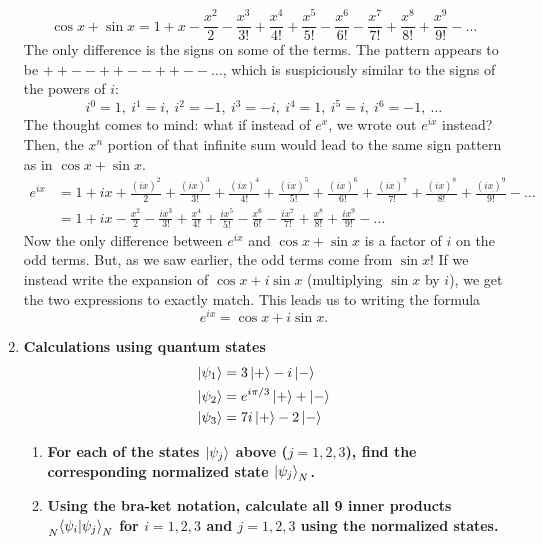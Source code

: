 \documentclass[11pt]{article}
\begin{document}
\begin{enumerate}[label=\textbf{\arabic*.}]
{\begin{enumerate}[label=\textbf{(\alph*)}]
                \[\cos x+\sin x=1+x-\frac{x^2}{2}-\frac{x^3}{3!}+\frac{x^4}{4!}+\frac{x^5}{5!}-\frac{x^6}{6!}-\frac{x^7}{7!}+\frac{x^8}{8!}+\frac{x^9}{9!}-\ldots\]
                The only difference is the signs on some of the terms. The pattern appears to be \(++--++--++--\ldots\), which is suspiciously similar to the signs of the powers of \(i\):
                \[i^0=1,\ i^1=i,\ i^2=-1,\ i^3=-i,\ i^4=1,\ i^5=i,\ i^6=-1,\ \ldots\]
                The thought comes to mind: what if instead of \(e^x\), we wrote out \(e^{ix}\) instead? Then, the \(x^n\) portion of that infinite sum would lead to the same sign pattern as in \(\cos x+\sin x\).
                \begin{align*}
                    e^{ix}&=1+ix+\frac{(ix)^2}{2}+\frac{(ix)^3}{3!}+\frac{(ix)^4}{4!}+\frac{(ix)^5}{5!}+\frac{(ix)^6}{6!}+\frac{(ix)^7}{7!}+\frac{(ix)^8}{8!}+\frac{(ix)^9}{9!}-\ldots \\
                    &=1+ix-\frac{x^2}{2}-\frac{ix^3}{3!}+\frac{x^4}{4!}+\frac{ix^5}{5!}-\frac{x^6}{6!}-\frac{ix^7}{7!}+\frac{x^8}{8!}+\frac{ix^9}{9!}-\ldots
                \end{align*}
                Now the only difference between \(e^{ix}\) and \(\cos x+\sin x\) is a factor of \(i\) on the odd terms. But, as we saw earlier, the odd terms come from \(\sin x\)! If we instead write the expansion of \(\cos x+i\sin x\) (multiplying \(\sin x\) by \(i\)), we get the two expressions to exactly match. This leads us to writing the formula
                \[e^{ix}=\cos x+i\sin x.\]
            \end{enumerate}
        }
        \item{
            \textbf{\boldmath Calculations using quantum states \begin{align*}\ket{\psi_1}&=3\ket{+}-i\ket{-} \\ \ket{\psi_2}&=e^{i\pi/3}\ket{+}+\ket{-} \\ \ket{\psi_3}&=7i\ket{+}-2\ket{-}\end{align*}}
            \begin{enumerate}[label=\textbf{(\alph*)}]
                \item{
                    \textbf{\boldmath For each of the states \(\ket{\psi_j}\) above (\(j=1,2,3\)), find the corresponding normalized state \(\ket{\psi_j}_N\).}
                }
                \item{
                    \textbf{\boldmath Using the bra-ket notation, calculate all 9 inner products \(\prescript{}{N}{\braket{\psi_i|\psi_j}_N}\) for \(i=1,2,3\) and \(j=1,2,3\) using the normalized states.}
}
\end{enumerate}}
\end{enumerate}
\end{document}
